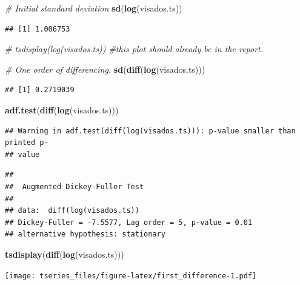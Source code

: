\documentclass[]{article}
\newenvironment{Shaded}{\begin{snugshade}}{\end{snugshade}}
\newcommand{\KeywordTok}[1]{\textcolor[rgb]{0.13,0.29,0.53}{\textbf{{#1}}}}
\newcommand{\CommentTok}[1]{\textcolor[rgb]{0.56,0.35,0.01}{\textit{{#1}}}}
\newcommand{\NormalTok}[1]{{#1}}
\begin{document}
\begin{Shaded}
\begin{Highlighting}[]
\CommentTok{# Initial standard deviation}
\KeywordTok{sd}\NormalTok{(}\KeywordTok{log}\NormalTok{(visados.ts))}
\end{Highlighting}
\end{Shaded}

\begin{verbatim}
## [1] 1.006753
\end{verbatim}

\begin{Shaded}
\begin{Highlighting}[]
\CommentTok{# tsdisplay(log(visados.ts)) #this plot should already be in the report.}

\CommentTok{# One order of differencing.}
\KeywordTok{sd}\NormalTok{(}\KeywordTok{diff}\NormalTok{(}\KeywordTok{log}\NormalTok{(visados.ts)))}
\end{Highlighting}
\end{Shaded}

\begin{verbatim}
## [1] 0.2719039
\end{verbatim}

\begin{Shaded}
\begin{Highlighting}[]
\KeywordTok{adf.test}\NormalTok{(}\KeywordTok{diff}\NormalTok{(}\KeywordTok{log}\NormalTok{(visados.ts)))}
\end{Highlighting}
\end{Shaded}

\begin{verbatim}
## Warning in adf.test(diff(log(visados.ts))): p-value smaller than printed p-
## value
\end{verbatim}

\begin{verbatim}
## 
##  Augmented Dickey-Fuller Test
## 
## data:  diff(log(visados.ts))
## Dickey-Fuller = -7.5577, Lag order = 5, p-value = 0.01
## alternative hypothesis: stationary
\end{verbatim}

\begin{Shaded}
\begin{Highlighting}[]
\KeywordTok{tsdisplay}\NormalTok{(}\KeywordTok{diff}\NormalTok{(}\KeywordTok{log}\NormalTok{(visados.ts)))}
\end{Highlighting}
\end{Shaded}

\texttt{[image: tseries\_files/figure-latex/first\_difference-1.pdf]}
\end{document}
